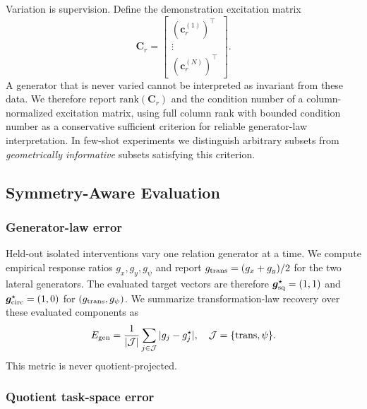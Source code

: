 \documentclass[letterpaper,10pt,conference]{ieeeconf}
\begin{document}
Variation is supervision. Define the demonstration excitation matrix
\begin{equation}
    \mathbf C_r=
    \begin{bmatrix}
    (\bm c_r^{(1)})^\top\\[-1mm]
    \vdots\\
    (\bm c_r^{(N)})^\top
    \end{bmatrix}.
\end{equation}
A generator that is never varied cannot be interpreted as invariant from these
data. We therefore report $\mathrm{rank}(\mathbf C_r)$ and the condition number
of a column-normalized excitation matrix, using full column rank with bounded
condition number as a conservative sufficient criterion for reliable
generator-law interpretation. In few-shot experiments we distinguish arbitrary
subsets from \emph{geometrically informative} subsets satisfying this criterion.

\subsection{Symmetry-Aware Evaluation}
\label{sec:evaluation}

\subsubsection{Generator-law error}

Held-out isolated interventions vary one relation generator at a time.
We compute empirical response ratios $g_x,g_y,g_\psi$ and report
$g_{\rm trans}=(g_x+g_y)/2$ for the two lateral generators. The evaluated
target vectors are therefore $\bm g_{\rm sq}^{\star}=(1,1)$ and
$\bm g_{\rm circ}^{\star}=(1,0)$ for $(g_{\rm trans},g_\psi)$. We summarize
transformation-law recovery over these evaluated components as
\begin{equation}
    E_{\rm gen}
    =
    \frac{1}{|\mathcal J|}
    \sum_{j\in\mathcal J}
    |g_j-g_j^{\star}|,\quad
    \mathcal J=\{\mathrm{trans},\psi\}.
    \label{eq:egen}
\end{equation}
This metric is never quotient-projected.

\subsubsection{Quotient task-space error}
\end{document}
